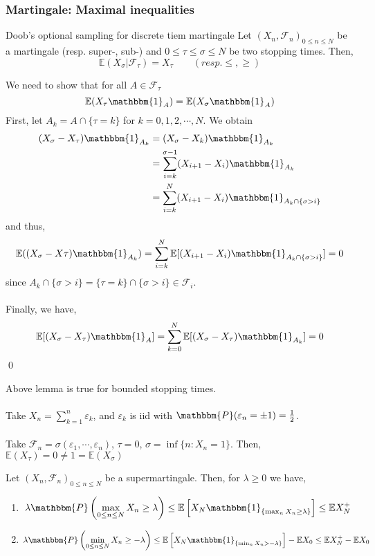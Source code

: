 \documentclass[12pt,a4paper]{article}
\newcommand{\E}{\mathbb{E}}
\renewenvironment{proof}
    {\begin{trivlist}\item[\hskip\labelsep\color{blue}\bfseries Proof:]}
    {\qed\end{trivlist}}
\begin{document}
\subsubsection{Martingale: Maximal inequalities}
\begin{lemma}{Doob's optional sampling for discrete tiem martingale}{}
    Let $(X_n, \mathscr{F}_n)_{0\le n\le N}$ be a martingale (resp. super-, sub-) and $0\le \tau\le \sigma\le N$ be two stopping times. Then,
    $$
    \E(X_\sigma|\mathscr{F}_\tau) = X_\tau \qquad (resp. \le, \ge)
    $$
\end{lemma}
\begin{proof}
    We need to show that for all $A\in \mathscr{F}_\tau$
    $$
    \E(X_\tau \mathbbm{1}_A) = \E(X_\sigma \mathbbm{1}_A)
    $$
    First, let $A_k = A\cap\{\tau =k\}$ for $k=0,1,2,\cdots,N$. We obtain
    \begin{align*}
        (X_\sigma - X_\tau)\mathbbm{1}_{A_k} &=(X_\sigma -X_k)\mathbbm{1}_{A_k}\\
        &= \sum_{i=k}^{\sigma-1} (X_{i+1}-X_i)\mathbbm{1}_{A_k}\\
        &= \sum_{i=k}^{N} (X_{i+1}-X_i)\mathbbm{1}_{A_k\cap \{\sigma >i\}}
    \end{align*}
    and thus,
    $$
    \E((X_\sigma-X\tau)\mathbbm{1}_{A_k}) = \sum_{i=k}^N\E[(X_{i+1}-X_i)\mathbbm{1}_{A_k\cap\{\sigma>i\}}]=0
    $$
    since $A_k\cap\{\sigma>i\}=\{\tau=k\}\cap\{\sigma>i\}\in\mathscr{F}_i$.\\
    \\
    Finally, we have,
    $$
    \E[(X_\sigma-X_\tau)\mathbbm{1}_A] = \sum_{k=0}^N \E[(X_\sigma-X_\tau)\mathbbm{1}_{A_k}]=0
    $$
\end{proof}
\begin{remark}{}{}
    Above lemma is true for bounded stopping times.\\
    \\
    Take $X_n = \sum_{k=1}^n \varepsilon_k$, and $\varepsilon_k$ is iid with $\mathbbm{P}(\varepsilon_n = \pm 1) =\frac{1}{2}$.\\
    \\
    Take $\mathscr{F}_n = \sigma(\varepsilon_1,\cdots, \varepsilon_n)$, $\tau=0$, $\sigma=\inf\{n: X_n=1\}$. Then, $\E(X_\tau)=0\neq 1=\E(X_\sigma)$
\end{remark}
\begin{lemma}{}{}
    Let $(X_n,\mathscr{F}_n)_{0\le n\le N}$ be a supermartingale. Then, for $\lambda\ge 0$ we have,
    \begin{enumerate}
        \item[1)]
        $$
        \lambda\mathbbm{P}\left(\max_{0\le n\le N}X_n\ge \lambda\right)\le \E\left[X_N \mathbbm{1}_{\{\max_{n}X_n\ge \lambda\}}\right]\le \E X_N^+
        $$
        \item[2)]
        $$
        \lambda\mathbbm{P}\left(\min_{0\le n\le N}X_n\ge -\lambda\right)\le \E\left[X_N\mathbbm{1}_{\{\min_{n} X_n>-\lambda\}}\right]-\E X_0 \le \E X_N^+-\E X_0
        $$
    \end{enumerate}
\end{lemma}
\end{document}
